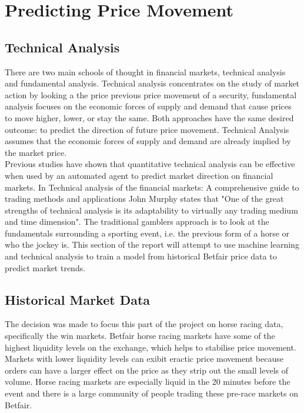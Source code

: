 \chapter{Predicting Price Movement}
	\section{Technical Analysis}
		There are two main schools of thought in financial markets, technical analysis and fundamental analysis. Technical analysis concentrates on the study of market action by looking a the price previous price movement of a security, fundamental analysis focuses on the economic forces of supply and demand that cause prices to move higher, lower, or stay the same\cite{murphy1999technical}. Both approaches have the same desired outcome: to predict the direction of future price movement. Technical Analysis assumes that the economic forces of supply and demand are already implied by the market price.\\
		
		Previous studies have shown that quantitative technical analysis can be effective when used by an automated agent to predict market direction on financial markets\cite{schoreels2004agent}. In Technical analysis of the financial markets: A comprehensive guide to trading methods and applications\cite{murphy1999technical} John Murphy states that "One of the great strengths of technical analysis is its adaptability to virtually any trading medium and time dimension". The traditional gamblers approach is to look at the fundamentals surrounding a sporting event, i.e. the previous form of a horse or who the jockey is. This section of the report will attempt to use machine learning and technical analysis to train a model from historical Betfair price data to predict market trends.
		
	\section{Historical Market Data}
		The decision was made to focus this part of the project on horse racing data, specifically the win markets. Betfair horse racing markets have some of the highest liquidity levels on the exchange, which helps to stabilise price movement. Markets with lower liquidity levels can exibit eractic price movement because orders can have a larger effect on the price as they strip out the small levels of volume. Horse racing markets are especially liquid in the 20 minutes before the event and there is a large community of people trading these pre-race markets on Betfair.\cite{coldTradingOnBetfair}\cite{googleSearchHorseRacing}\\
		
